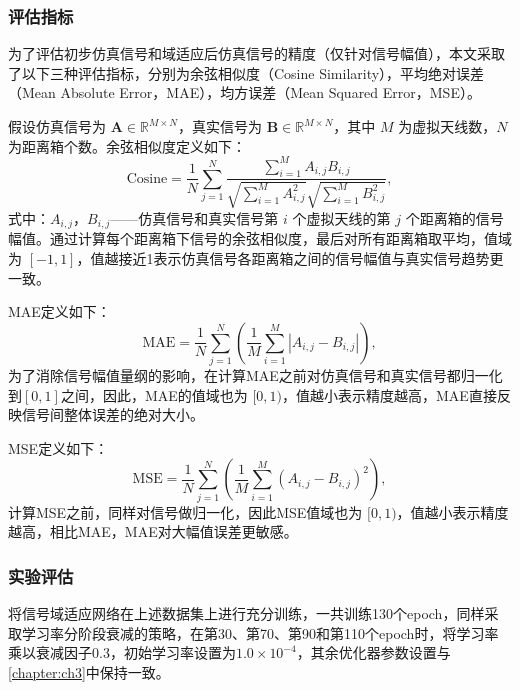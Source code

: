 \subsubsection{评估指标}
为了评估初步仿真信号和域适应后仿真信号的精度（仅针对信号幅值），本文采取了以下三种评估指标，分别为余弦相似度（Cosine Similarity），平均绝对误差（Mean Absolute Error，MAE），均方误差（Mean Squared Error，MSE）。

假设仿真信号为 $\mathbf{A} \in \mathbb{R}^{M \times N}$，真实信号为 $\mathbf{B} \in \mathbb{R}^{M \times N}$，其中 $M$ 为虚拟天线数，$N$ 为距离箱个数。余弦相似度定义如下：
\begin{equation}
    \text{Cosine} = \frac{1}{N} \sum_{j=1}^N \frac{\sum_{i=1}^{M} A_{i,j} B_{i,j}}{\sqrt{\sum_{i=1}^{M} A_{i,j}^2} \sqrt{\sum_{i=1}^{M} B_{i,j}^2}},
\end{equation}
式中：$A_{i,j}$，$B_{i,j}$——仿真信号和真实信号第 $i$ 个虚拟天线的第 $j$ 个距离箱的信号幅值。通过计算每个距离箱下信号的余弦相似度，最后对所有距离箱取平均，值域为 $[-1, 1]$，值越接近1表示仿真信号各距离箱之间的信号幅值与真实信号趋势更一致。

MAE定义如下：
\begin{equation}
    \text{MAE} = \frac{1}{N} \sum_{j=1}^N \left( \frac{1}{M} \sum_{i=1}^{M} |A_{i,j} - B_{i,j}| \right),
\end{equation}
为了消除信号幅值量纲的影响，在计算MAE之前对仿真信号和真实信号都归一化到$[0,1]$之间，因此，MAE的值域也为 $[0, 1)$，值越小表示精度越高，MAE直接反映信号间整体误差的绝对大小。

MSE定义如下：
\begin{equation}
    \text{MSE} = \frac{1}{N} \sum_{j=1}^N \left( \frac{1}{M} \sum_{i=1}^{M} (A_{i,j} - B_{i,j})^2 \right),
\end{equation}
计算MSE之前，同样对信号做归一化，因此MSE值域也为 $[0, 1)$，值越小表示精度越高，相比MAE，MAE对大幅值误差更敏感。
\subsubsection{实验评估}
将信号域适应网络在上述数据集上进行充分训练，一共训练130个epoch，同样采取学习率分阶段衰减的策略，在第30、第70、第90和第110个epoch时，将学习率乘以衰减因子0.3，初始学习率设置为$1.0 \times 10^{-4}$，其余优化器参数设置与\ref{chapter:ch3}中保持一致。

